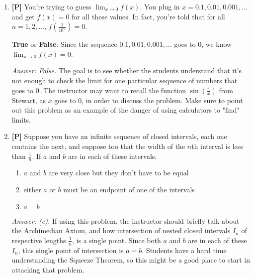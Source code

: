 \documentclass[12pt]{article}
\begin{document}
\begin{enumerate}
{\it Answer: False.} Going to the limit is not monotonic! As a counterexample you can consider 
\[ f(x)=\left\{ \begin{array}{cl}
		2x & x\ge 0 \\
		-x & x<0
		\end{array}\right.\]
Then $\displaystyle{\lim_{x\rightarrow 0}f(x)=0}$, and take $x_1=0.25$, $x_2=-0.35$.

\bigskip

\item {\bf [P]} You're trying to guess $\displaystyle{\lim_{x \rightarrow 0}
f(x)}$. You plug in $x=0.1, 0.01, 0.001, \dots$ and get $f(x)=0$ for
all these values. In fact, you're told that for all $n=1, 2, \dots$,
$\displaystyle{f(\frac{1}{10^n})}=0$.

{\bf True} or \textbf{False}: Since the sequence $0.1, 0.01, 0.001,
\dots$ goes to 0, we know $\displaystyle{\lim_{x \rightarrow 0}
f(x)}=0$.

{\it Answer: False.} The goal is to see whether the students understand that
it's not enough to check the limit for one particular sequence of
numbers that goes to 0. The instructor may want to 
recall the function $\displaystyle{\sin (\frac{\pi}{x})}$ from Stewart, as $x$ goes to 0, 
in order to discuss the problem. Make sure to point out this problem 
as an example of the danger of using calculators to "find" limits. 

\bigskip

\item {\bf [P]} Suppose you have an infinite sequence of closed intervals, each one contains the next, and suppose too that the width of the $n$th interval is less than $\frac{1}{n}$. If $a$ and $b$ are in each of these intervals,
\begin {enumerate}
\item $a$ and $b$ are very close but they don't have to be equal
\item either $a$ or $b$ must be an endpoint of one of the intervals
\item $a=b$
\end{enumerate}

{\it Answer: (c).} If using this problem, the instructor should briefly talk about the Archimedian Axiom, and how intersection of nested closed intervals $I_n$ of respective lengths $\frac{1}{n}$, is a single point. Since both $a$ and $b$ are in each of these $I_n$, this single point of intersection is $a=b$. Students have a hard time understanding the Squeeze Theorem, so this might be a good place to start in attacking that problem.


\end{enumerate}
\end{document}
